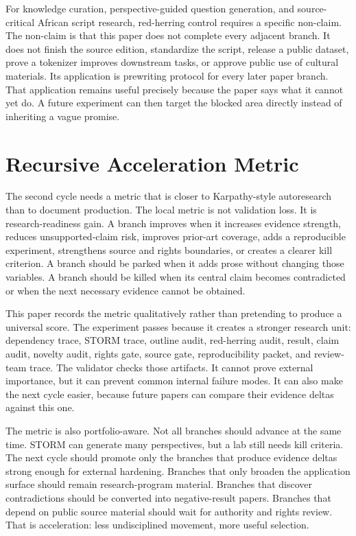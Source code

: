 \documentclass[sigconf,nonacm]{acmart}
\begin{document}
For knowledge curation, perspective-guided question generation, and source-critical African script research, red-herring control requires a specific non-claim. The non-claim is
that this paper does not complete every adjacent branch. It does not finish the
source edition, standardize the script, release a public dataset, prove a
tokenizer improves downstream tasks, or approve public use of cultural
materials. Its application is prewriting protocol for every later paper branch. That application remains useful
precisely because the paper says what it cannot yet do. A future experiment can
then target the blocked area directly instead of inheriting a vague promise.

\section{Recursive Acceleration Metric}
The second cycle needs a metric that is closer to Karpathy-style autoresearch
than to document production. The local metric is not validation loss. It is
research-readiness gain. A branch improves when it increases evidence strength,
reduces unsupported-claim risk, improves prior-art coverage, adds a reproducible
experiment, strengthens source and rights boundaries, or creates a clearer kill
criterion. A branch should be parked when it adds prose without changing those
variables. A branch should be killed when its central claim becomes contradicted
or when the next necessary evidence cannot be obtained.

This paper records the metric qualitatively rather than pretending to produce a
universal score. The experiment passes because it creates a stronger research
unit: dependency trace, STORM trace, outline audit, red-herring audit, result,
claim audit, novelty audit, rights gate, source gate, reproducibility packet,
and review-team trace. The validator checks those artifacts. It cannot prove
external importance, but it can prevent common internal failure modes. It can
also make the next cycle easier, because future papers can compare their
evidence deltas against this one.

The metric is also portfolio-aware. Not all branches should advance at the same
time. STORM can generate many perspectives, but a lab still needs kill criteria.
The next cycle should promote only the branches that produce evidence deltas
strong enough for external hardening. Branches that only broaden the application
surface should remain research-program material. Branches that discover
contradictions should be converted into negative-result papers. Branches that
depend on public source material should wait for authority and rights review.
That is acceleration: less undisciplined movement, more useful selection.
\end{document}
